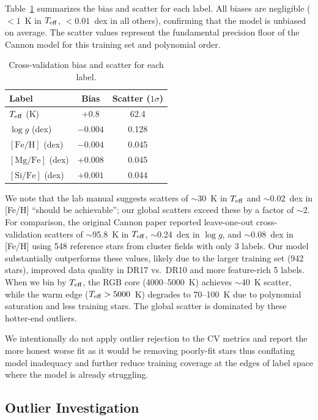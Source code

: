\documentclass[10pt,preprint2]{aastex}
\begin{document}
Table~\ref{tab:cv_metrics} summarizes the bias and scatter for each label. All biases are negligible ($< 1$~K in $T_{\rm eff}$, $< 0.01$~dex in all others), confirming that the model is unbiased on average. The scatter values represent the fundamental precision floor of the Cannon model for this training set and polynomial order.

\begin{table}[H]
\centering
\caption{Cross-validation bias and scatter for each label.\label{tab:cv_metrics}}
\begin{tabular}{lcc}
\toprule
Label & Bias & Scatter ($1\sigma$) \\
\midrule
$T_{\rm eff}$ (K)   & $+0.8$   & 62.4  \\
$\log g$ (dex)       & $-0.004$ & 0.128 \\
$[\mathrm{Fe/H}]$ (dex) & $-0.004$ & 0.045 \\
$[\mathrm{Mg/Fe}]$ (dex) & $+0.008$ & 0.045 \\
$[\mathrm{Si/Fe}]$ (dex) & $+0.001$ & 0.044 \\
\bottomrule
\end{tabular}
\end{table}

We note that the lab manual suggests scatters of $\sim$30~K in $T_{\rm eff}$ and $\sim$0.02~dex in [Fe/H] ``should be achievable''; our global scatters exceed these by a factor of $\sim$2. For comparison, the original Cannon paper \citep{Ness2015} reported leave-one-out cross-validation scatters of $\sim$95.8~K in $T_{\rm eff}$, $\sim$0.24~dex in $\log g$, and $\sim$0.08~dex in [Fe/H] using 548 reference stars from cluster fields with only 3 labels. Our model substantially outperforms these values, likely due to the larger training set (942 stars), improved data quality in DR17 vs.\ DR10 and more feature-rich 5 labels. When we bin by $T_{\rm eff}$, the RGB core (4000--5000~K) achieves $\sim$40~K scatter, while the warm edge ($T_{\rm eff} > 5000$~K) degrades to 70--100~K due to polynomial saturation and less training stars. The global scatter is dominated by these hotter-end outliers. 

We intentionally do not apply outlier rejection to the CV metrics and report the more honest worse fit as it would be removing poorly-fit stars thus conflating model inadequacy and further reduce training coverage at the edges of label space where the model is already struggling.

\subsection{Outlier Investigation}
\end{document}
